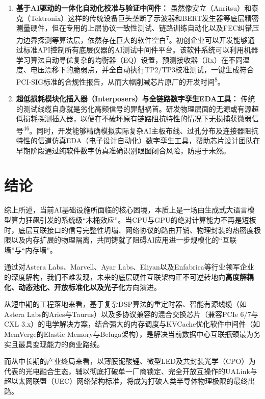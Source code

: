 \begin{enumerate}
  \item \textbf{基于AI驱动的一体化自动化校准与验证中间件：} 虽然像安立（Anritsu）和泰克（Tektronix）这样的传统设备巨头垄断了示波器和BERT发生器等底层精密测量硬件，但在专用的上层协议一致性测试、链路训练自动化以及FEC纠错压力边界探测等算法层，依然存在巨大的软件空白\textsuperscript{7}。初创企业可以开发能够通过标准API控制所有底层仪器的AI测试中间件平台。该软件系统可以利用机器学习算法自动寻优复杂的均衡器（EQ）设置，预测接收器（Rx）在不同温度、电压漂移下的脆弱点，并全自动执行TP2/TP3校准测试，一键生成符合PCI-SIG标准的合规性报告，从而大幅削减芯片原厂的开发时间\textsuperscript{8}。
  \item \textbf{超低损耗模块化插入器（Interposers）与全链路数字孪生EDA工具：} 传统的测试线缆自身就是劣化高频信号的罪魁祸首。研发物理层面的无源或有源超低损耗探测插入器，以便在不破坏原有链路阻抗特性的情况下无损捕获微弱信号\textsuperscript{46}。同时，开发能够精确模拟实际复杂AI主板布线、过孔分布及连接器阻抗特性的信道仿真EDA（电子设计自动化）数字孪生工具，帮助芯片设计团队在早期阶段通过纯软件数字仿真准确识别眼图闭合风险，防患于未然。
\end{enumerate}

\section{结论}

综上所述，当前AI基础设施所面临的核心困境，本质上是一场由生成式大语言模型算力狂飙引发的系统级``木桶效应''。当CPU与GPU的绝对计算能力不再是短板时，底层互联接口的信号完整性坍塌、网络协议的路由开销、物理封装的热密度极限以及内存扩展的物理隔离，共同铸就了阻碍AI应用进一步规模化的``互联墙''与``内存墙''。

通过对Astera Labs、Marvell、Ayar Labs、Eliyan以及Enfabrica等行业领军企业的深度解构，我们不难发现，未来的底层硬件互联架构正不可逆转地向\textbf{高度解耦化、动态池化、开放标准化以及光子化}方向演进。

从短中期的工程落地来看，基于复杂DSP算法的重定时器、智能有源线缆（如Astera Labs的Aries与Taurus）以及多协议兼容的混合交换芯片（兼容PCIe 6/7与CXL 3.x）的电学解决方案，结合强大的内存调度与KVCache优化软件中间件（如MemVerge的Elastic Memory与Beluga架构），是解决当前数据中心互联瓶颈最为务实且最具变现能力的商业路线。

而从中长期的产业终局来看，以薄膜铌酸锂、微型LED及共封装光学（CPO）为代表的光电融合生态，辅以彻底打破单一厂商锁定、完全开放互操作的UALink与超以太网联盟（UEC）网络架构标准，将成为打破人类半导体物理极限的最终出路。

